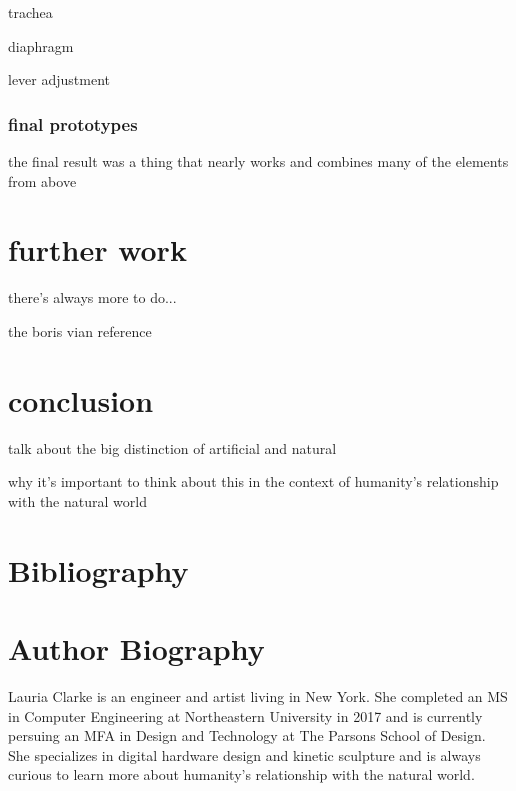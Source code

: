 \documentclass[letterpaper]{article}
\begin{document}
trachea

diaphragm

lever adjustment

\subsubsection{final prototypes}

the final result was a thing that nearly works and combines many of the elements from above

\section{further work}

there's always more to do...

the boris vian reference 


\section{conclusion}

talk about the big distinction of artificial and natural

why it's important to think about this in the context of humanity's relationship with the natural world


%





\section{Bibliography}

\section{Author Biography}
Lauria Clarke is an engineer and artist living in New York. She completed an MS in Computer Engineering at Northeastern University in 2017 and is currently persuing an MFA in Design and Technology at The Parsons School of Design. She specializes in digital hardware design and kinetic sculpture and is always curious to learn more about humanity's relationship with the natural world.

\end{document}
